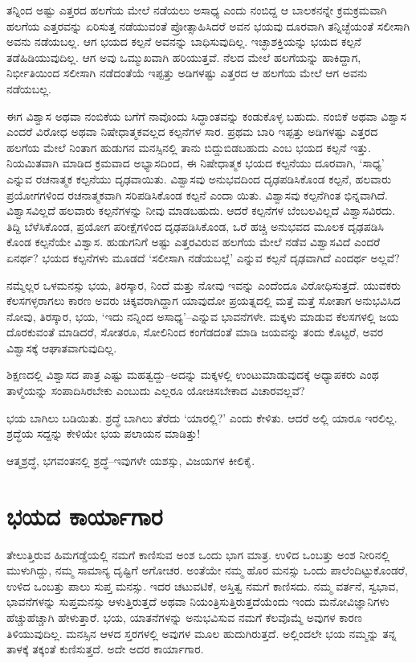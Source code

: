 ತನ್ನಿಂದ ಅಷ್ಟು ಎತ್ತರದ ಹಲಗೆಯ ಮೇಲೆ ನಡೆಯಲು ಅಸಾಧ್ಯ ಎಂದು ನಂಬಿದ್ದ ಆ ಬಾಲಕನನ್ನೇ ಕ್ರಮಕ್ರಮವಾಗಿ ಹಲಗೆಯ ಎತ್ತರವನ್ನು ಏರಿಸುತ್ತ ನಡೆಯುವಂತೆ ಪ್ರೋತ್ಸಾಹಿಸಿದರೆ ಅವನ ಭಯವು ದೂರವಾಗಿ ತನ್ನಿಚ್ಛೆಯಂತೆ ಸಲೀಸಾಗಿ ಅವನು ನಡೆಯಬಲ್ಲ. ಆಗ ಭಯದ ಕಲ್ಪನೆ ಅವನನ್ನು ಬಾಧಿಸುವುದಿಲ್ಲ. ಇಚ್ಛಾಶಕ್ತಿಯನ್ನು ಭಯದ ಕಲ್ಪನೆ ತಡೆಹಿಡಿಯುವುದಿಲ್ಲ. ಆಗ ಅವು ಒಮ್ಮುಖವಾಗಿ ಹರಿಯುತ್ತವೆ. ನೆಲದ ಮೇಲೆ ಹಲಗೆಯನ್ನು ಹಾಕಿದ್ದಾಗ, ನಿರ್ಭೀತಿಯಿಂದ ಸಲೀಸಾಗಿ ನಡೆದಂತೆಯೆ ಇಪ್ಪತ್ತು ಅಡಿಗಳಷ್ಟು ಎತ್ತರದ ಆ ಹಲಗೆಯ ಮೇಲೆ ಆಗ ಅವನು ನಡೆಯಬಲ್ಲ.

ಈಗ ವಿಶ್ವಾಸ ಅಥವಾ ನಂಬಿಕೆಯ ಬಗೆಗೆ ನಾವೊಂದು ಸಿದ್ಧಾಂತವನ್ನು ಕಂಡುಕೊಳ್ಳ ಬಹುದು. ನಂಬಿಕೆ ಅಥವಾ ವಿಶ್ವಾಸ ಎಂದರೆ ವಿರೋಧ ಅಥವಾ ನಿಷೇಧಾತ್ಮಕವಲ್ಲದ ಕಲ್ಪನೆಗಳ ಸಾರ. ಪ್ರಥಮ ಬಾರಿ ಇಪ್ಪತ್ತು ಅಡಿಗಳಷ್ಟು ಎತ್ತರದ ಹಲಗೆಯ ಮೇಲೆ ನಿಂತಾಗ ಹುಡುಗನ ಮನಸ್ಸಿನಲ್ಲಿ ತಾನು ಬಿದ್ದುಬಿಡಬಹುದು ಎಂಬ ಭಯದ ಕಲ್ಪನೆ ಇತ್ತು. ನಿಯಮಿತವಾಗಿ ಮಾಡಿದ ಕ್ರಮವಾದ ಅಭ್ಯಾಸದಿಂದ, ಈ ನಿಷೇಧಾತ್ಮಕ ಭಯದ ಕಲ್ಪನೆಯು ದೂರವಾಗಿ, ‘ಸಾಧ್ಯ’ ಎನ್ನುವ ರಚನಾತ್ಮಕ ಕಲ್ಪನೆಯು ದೃಢವಾಯಿತು. ವಿಶ್ವಾಸವು ಅನುಭವದಿಂದ ದೃಢಪಡಿಸಿಕೊಂಡ ಕಲ್ಪನೆ, ಹಲವಾರು ಪ್ರಯೋಗಗಳಿಂದ ರಚನಾತ್ಮಕವಾಗಿ ಸರಿಪಡಿಸಿಕೊಂಡ ಕಲ್ಪನೆ ಎಂದಾ ಯಿತು. ವಿಶ್ವಾಸವು ಕಲ್ಪನೆಗಿಂತ ಭಿನ್ನವಾಗಿದೆ. ವಿಶ್ವಾಸವಿಲ್ಲದೆ ಹಲವಾರು ಕಲ್ಪನೆಗಳನ್ನು ನೀವು ಮಾಡಬಹುದು. ಆದರೆ ಕಲ್ಪನೆಗಳ ಬೆಂಬಲವಿಲ್ಲದೆ ವಿಶ್ವಾಸವಿರದು. ತಿದ್ದಿ ಬೆಳೆಸಿಕೊಂಡ, ಪ್ರಯೋಗ ಪರೀಕ್ಷೆಗಳಿಂದ ದೃಢಪಡಿಸಿಕೊಂಡ, ಒರೆ ಹಚ್ಚಿ ಅನುಭವದ ಮೂಲಕ ದೃಢಪಡಿಸಿ ಕೊಂಡ ಕಲ್ಪನೆಯೇ ವಿಶ್ವಾಸ. ಹುಡುಗನಿಗೆ ಅಷ್ಟು ಎತ್ತರವಿರುವ ಹಲಗೆಯ ಮೇಲೆ ನಡೆವ ವಿಶ್ವಾಸವಿದೆ ಎಂದರೆ ಏನರ್ಥ? ಭಯದ ಕಲ್ಪನೆಗಳು ಮೂಡದೆ ‘ಸಲೀಸಾಗಿ ನಡೆಯಬಲ್ಲೆ’ ಎನ್ನುವ ಕಲ್ಪನೆ ದೃಢವಾಗಿದೆ ಎಂದರ್ಥ ಅಲ್ಲವೆ?

ನಮ್ಮೆಲ್ಲರ ಒಳಮನಸ್ಸು ಭಯ, ತಿರಸ್ಕಾರ, ನಿಂದೆ ಮತ್ತು ನೋವು ಇವನ್ನು ಎಂದೆಂದೂ ವಿರೋಧಿಸುತ್ತದೆ. ಯುವಕರು ಕೆಲಸಗಳ್ಳರಾಗಲು ಕಾರಣ ಅವರು ಚಿಕ್ಕವರಾಗಿದ್ದಾಗ ಯಾವುದೋ ಪ್ರಯತ್ನದಲ್ಲಿ ಮತ್ತೆ ಮತ್ತೆ ಸೋತಾಗ ಅನುಭವಿಸಿದ ನೋವು, ತಿರಸ್ಕಾರ, ಭಯ, ‘ಇದು ನನ್ನಿಂದ ಅಸಾಧ್ಯ’–ಎನ್ನುವ ಭಾವನೆಗಳೇ. ಮಕ್ಕಳು ಮಾಡುವ ಕೆಲಸಗಳಲ್ಲಿ ಜಯ ದೊರಕುವಂತೆ ಮಾಡಿದರೆ, ಸೋತರೂ, ಸೋಲಿನಿಂದ ಕಂಗೆಡದಂತೆ ಮಾಡಿ ಜಯವನ್ನು ತಂದು ಕೊಟ್ಟರೆ, ಅವರ ವಿಶ್ವಾಸಕ್ಕೆ ಆಘಾತವಾಗುವುದಿಲ್ಲ.

ಶಿಕ್ಷಣದಲ್ಲಿ ವಿಶ್ವಾಸದ ಪಾತ್ರ ಎಷ್ಟು ಮಹತ್ವದ್ದು–ಅದನ್ನು ಮಕ್ಕಳಲ್ಲಿ ಉಂಟುಮಾಡುವುದಕ್ಕೆ ಅಧ್ಯಾಪಕರು ಎಂಥ ತಾಳ್ಮೆಯನ್ನು ಸಂಪಾದಿಸಿರಬೇಕು ಎಂಬುದು ಎಲ್ಲರೂ ಯೋಚಿಸಬೇಕಾದ ವಿಚಾರವಲ್ಲವೆ?

ಭಯ ಬಾಗಿಲು ಬಡಿಯಿತು. ಶ್ರದ್ಧೆ ಬಾಗಿಲು ತೆರೆದು ‘ಯಾರಲ್ಲಿ?’ ಎಂದು ಕೇಳಿತು. ಆದರೆ ಅಲ್ಲಿ ಯಾರೂ ಇರಲಿಲ್ಲ. ಶ್ರದ್ಧೆಯ ಸದ್ದನ್ನು ಕೇಳಿಯೇ ಭಯ ಪಲಾಯನ ಮಾಡಿತ್ತು!

ಆತ್ಮಶ್ರದ್ಧೆ, ಭಗವಂತನಲ್ಲಿ ಶ್ರದ್ಧೆ–ಇವುಗಳೇ ಯಶಸ್ಸು, ವಿಜಯಗಳ ಕೀಲಿಕೈ.


\section*{ಭಯದ ಕಾರ್ಯಾಗಾರ}


ತೇಲುತ್ತಿರುವ ಹಿಮಗಡ್ಡೆಯಲ್ಲಿ ನಮಗೆ ಕಾಣಿಸುವ ಅಂಶ ಒಂದು ಭಾಗ ಮಾತ್ರ. ಉಳಿದ ಒಂಬತ್ತು ಅಂಶ ನೀರಿನಲ್ಲಿ ಮುಳುಗಿದ್ದು, ನಮ್ಮ ಸಾಮಾನ್ಯ ದೃಷ್ಟಿಗೆ ಅಗೋಚರ. ಅಂತೆಯೇ ನಮ್ಮ ಹೊರ ಮನಸ್ಸು ಒಂದು ಪಾಲೆಂದಿಟ್ಟುಕೊಂಡರೆ, ಉಳಿದ ಒಂಬತ್ತು ಪಾಲು ಸುಪ್ತ ಮನಸ್ಸು. ಇದರ ಚಟುವಟಿಕೆ, ಅಸ್ತಿತ್ವ ನಮಗೆ ಕಾಣಿಸದು. ನಮ್ಮ ವರ್ತನೆ, ಸ್ವಭಾವ, ಭಾವನೆಗಳನ್ನು ಸುಪ್ತಮನಸ್ಸು ಆಳುತ್ತಿರುತ್ತದೆ ಅಥವಾ ನಿಯಂತ್ರಿಸುತ್ತಿರುತ್ತದೆಯೆಂದು ಇಂದು ಮನೋವಿಜ್ಞಾನಿಗಳು ಹೆಚ್ಚುಹೆಚ್ಚಾಗಿ ಹೇಳುತ್ತಾರೆ. ಭಯ, ಯಾತನೆಗಳನ್ನು ಅನುಭವಿಸುವ ನಮಗೆ ಕೆಲವೊಮ್ಮೆ ಅವುಗಳ ಕಾರಣ ತಿಳಿಯುವುದಿಲ್ಲ. ಮನಸ್ಸಿನ ಆಳದ ಸ್ತರಗಳಲ್ಲಿ ಅವುಗಳ ಮೂಲ ಹುದುಗಿರುತ್ತದೆ. ಅಲ್ಲಿಂದಲೇ ಭಯ ನಮ್ಮನ್ನು ತನ್ನ ತಾಳಕ್ಕೆ ತಕ್ಕಂತೆ ಕುಣಿಸುತ್ತದೆ. ಅದೇ ಅದರ ಕಾರ್ಯಾಗಾರ.


